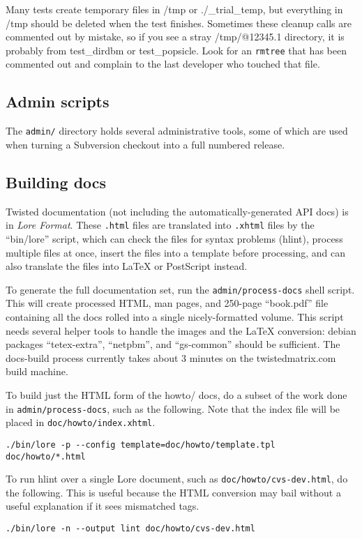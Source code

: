 Many tests create temporary files in /tmp or ./\_trial\_temp, but everything in /tmp should be deleted when the test finishes. Sometimes these cleanup calls are commented out by mistake, so if you see a stray /tmp/@12345.1 directory, it is probably from test\_dirdbm or test\_popsicle. Look for an \texttt{rmtree} that has been commented out and complain to the last developer who touched that file.

\subsection{Admin scripts}


The \texttt{admin/} directory holds several administrative tools, some of which are used when turning a Subversion checkout into a full numbered release.

\subsection{Building docs}


Twisted documentation (not including the automatically-generated API docs) is in \textit{Lore Format}. These \texttt{.html} files are translated into \texttt{.xhtml} files by the ``bin/lore'' script, which can check the files for syntax problems (hlint), process multiple files at once, insert the files into a template before processing, and can also translate the files into LaTeX or PostScript instead.

To generate the full documentation set, run the \texttt{admin/process-docs} shell script. This will create processed HTML, man pages, and 250-page ``book.pdf'' file containing all the docs rolled into a single nicely-formatted volume. This script needs several helper tools to handle the images and the LaTeX conversion: debian packages ``tetex-extra'', ``netpbm'', and ``gs-common'' should be sufficient. The docs-build process currently takes about 3 minutes on the twistedmatrix.com build machine.

To build just the HTML form of the howto/ docs, do a subset of the work done in \texttt{admin/process-docs}, such as the following. Note that the index file will be placed in \texttt{doc/howto/index.\linebreak[1]xhtml}.\begin{verbatim}
./bin/lore -p --config template=doc/howto/template.tpl doc/howto/*.html
\end{verbatim}


To run hlint over a single Lore document, such as \texttt{doc/howto/cvs-dev.\linebreak[1]html}, do the following. This is useful because the HTML conversion may bail without a useful explanation if it sees mismatched tags.\begin{verbatim}
./bin/lore -n --output lint doc/howto/cvs-dev.html
\end{verbatim}


